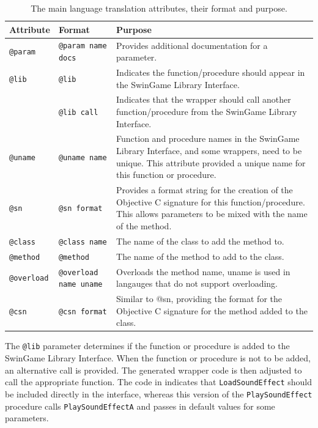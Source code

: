 \begin{table}[htbp]
    \footnotesize
    \centering
    \caption{The main language translation attributes, their format and purpose.}
    \label{tbl:attributes}
    \begin{tabular}{l|l|p{8cm}}
    Attribute & Format & Purpose \\
    \hline
    \texttt{@param} & \texttt{@param name docs} & Provides additional documentation for a parameter. \\
    \texttt{@lib} & \texttt{@lib} & Indicates the function/procedure should appear in the SwinGame Library Interface. \\
    ~ & \texttt{@lib call} & Indicates that the wrapper should call another function/procedure from the SwinGame Library Interface. \\
    \texttt{@uname} & \texttt{@uname name} & Function and procedure names in the SwinGame Library Interface, and some wrappers, need to be unique. This attribute provided a unique name for this function or procedure. \\
    \texttt{@sn} & \texttt{@sn format} & Provides a format string for the creation of the Objective C signature for this function/procedure. This allows parameters to be mixed with the name of the method. \\
    \texttt{@class} & \texttt{@class name} & The name of the class to add the method to. \\
    \texttt{@method} & \texttt{@method} & The name of the method to add to the class. \\
    \texttt{@overload} & \texttt{@overload name uname} & Overloads the method name, uname is used in langauges that do not support overloading. \\
    \texttt{@csn} & \texttt{@csn format} & Similar to @sn, providing the format for the Objective C signature for the method added to the class. \\
    \end{tabular}
\end{table}

The \texttt{@lib} parameter determines if the function or procedure is added to the SwinGame Library Interface. When the function or procedure is not to be added, an alternative call is provided. The generated wrapper code is then adjusted to call the appropriate function. The code in  indicates that \texttt{LoadSoundEffect} should be included directly in the interface, whereas this version of the \texttt{PlaySoundEffect} procedure calls \texttt{PlaySoundEffectA} and passes in default values for some parameters.

